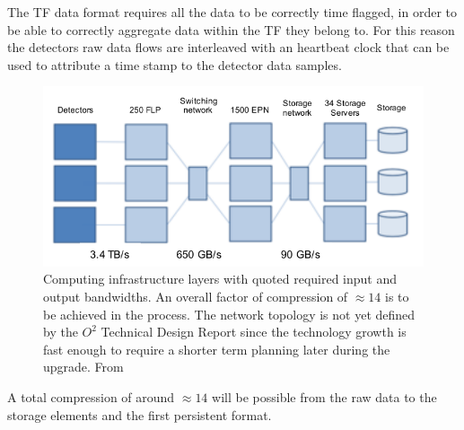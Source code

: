 The TF data format requires all the data to be correctly time flagged, in order to be able to correctly aggregate data within the TF they belong to.
For this reason the detectors raw data flows are interleaved with an heartbeat clock that can be used to attribute a time stamp to the detector data samples.


\begin{figure}[!ht]
\begin{center}
\includegraphics[width=0.75\linewidth]{Chapters/O2/Figs/Compression_2.pdf}
\caption{Computing infrastructure layers with quoted required input and output bandwidths. An overall factor of compression of $\approx14$ is to be achieved in the process. The network topology is not yet defined by the $O^2$ Technical Design Report since the technology growth is fast enough to require a shorter term planning later during the upgrade. From \cite{Buncic:2011297}}
\label{fig:O2_Compression}
\end{center}
\end{figure}

A total compression of around $\approx14$ \cite{o2compression} will be possible from the raw data to the storage elements and the first persistent format.

